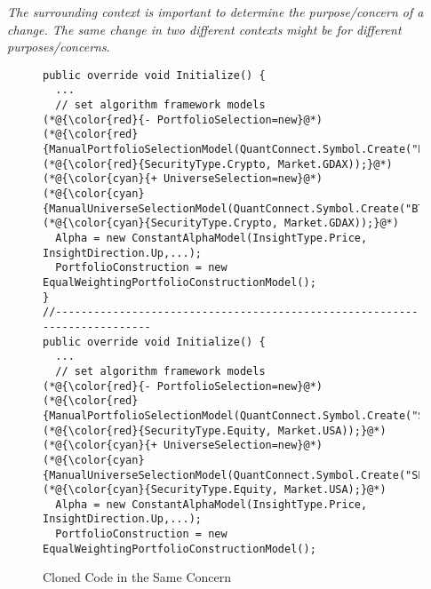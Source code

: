 {\em The surrounding context
  is important to determine the purpose/concern of a change. The same
  change in two different contexts might be for different
  purposes/concerns}.

\begin{figure}[t]
	\centering
	\begin{lstlisting}[]
public override void Initialize() {
  ...
  // set algorithm framework models
(*@{\color{red}{- PortfolioSelection=new}@*) (*@{\color{red}{ManualPortfolioSelectionModel(QuantConnect.Symbol.Create("BTCUSD",}@*) (*@{\color{red}{SecurityType.Crypto, Market.GDAX));}@*)   
(*@{\color{cyan}{+ UniverseSelection=new}@*) (*@{\color{cyan}{ManualUniverseSelectionModel(QuantConnect.Symbol.Create("BTCUSD",}@*) (*@{\color{cyan}{SecurityType.Crypto, Market.GDAX));}@*)
  Alpha = new ConstantAlphaModel(InsightType.Price, InsightDirection.Up,...);
  PortfolioConstruction = new EqualWeightingPortfolioConstructionModel();
}
//--------------------------------------------------------------------------
public override void Initialize() {
  ...
  // set algorithm framework models
(*@{\color{red}{- PortfolioSelection=new}@*) (*@{\color{red}{ManualPortfolioSelectionModel(QuantConnect.Symbol.Create("SPY",}@*) (*@{\color{red}{SecurityType.Equity, Market.USA));}@*)   
(*@{\color{cyan}{+ UniverseSelection=new}@*) (*@{\color{cyan}{ManualUniverseSelectionModel(QuantConnect.Symbol.Create("SPY",}@*) (*@{\color{cyan}{SecurityType.Equity, Market.USA);}@*)
  Alpha = new ConstantAlphaModel(InsightType.Price, InsightDirection.Up,...);
  PortfolioConstruction = new EqualWeightingPortfolioConstructionModel();
	\end{lstlisting}
        \vspace{-15pt}
        \caption{Cloned Code in the Same Concern}
        \vspace{-3pt}
        \label{fig:motiv-clone}
\end{figure}


